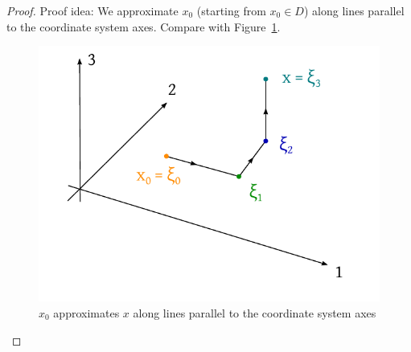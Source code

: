 \documentclass{article}
\begin{document}
\begin{proof}
  Proof idea: We approximate $x_0$ (starting from $x_0 \in D$) along lines parallel to the coordinate system axes. Compare with Figure~\ref{img:x0xcoord}.

  \begin{figure}[t]
    \begin{center}
      \includegraphics[width=.8\textwidth]{img/34_axes.pdf}
      \caption{$x_0$ approximates $x$ along lines parallel to the coordinate system axes}
      \label{img:x0xcoord}
    \end{center}
  \end{figure}


\end{proof}
\end{document}
